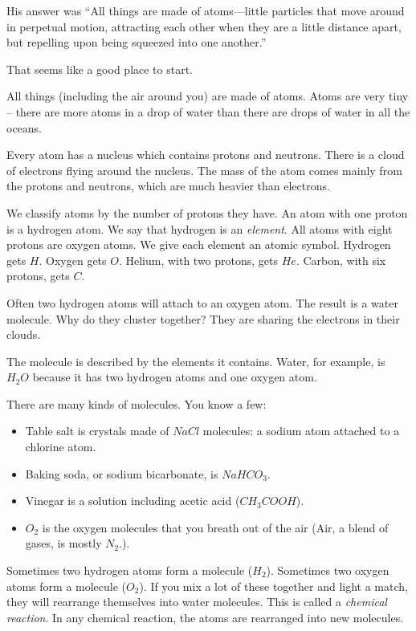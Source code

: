 His answer was ``All things are made of atoms—little particles that move around in
perpetual motion, attracting each other when they are a little
distance apart, but repelling upon being squeezed into one another.''

That seems like a good place to start.

All things (including the air around you) are made of atoms. Atoms are
very tiny -- there are more atoms in a drop of water than there are
drops of water in all the oceans.

Every atom has a nucleus which contains protons and neutrons. There is
a cloud of electrons flying around the nucleus. The mass of the atom
comes mainly from the protons and neutrons, which are much heavier
than electrons.  

We classify atoms by the number of protons they have. An atom with one
proton is a hydrogen atom. We say that hydrogen is an
\textit{element}. All atoms with eight protons are oxygen atoms. We
give each element an atomic symbol. Hydrogen gets $H$.  Oxygen gets
$O$. Helium, with two protons, gets $He$. Carbon, with six protons,
gets $C$.

Often two hydrogen atoms will attach to an oxygen atom.  The result is
a water molecule. Why do they cluster together? They are sharing the
electrons in their clouds.

The molecule is described by the elements it contains.  Water, for
example, is $H_2O$ because it has two hydrogen atoms and one oxygen
atom.

There are many kinds of molecules. You know a few:
\begin{itemize}
\item Table salt is crystals made of $NaCl$ molecules: a sodium atom attached to a chlorine atom.
\item Baking soda, or sodium bicarbonate, is $NaHCO_3$.
\item Vinegar is a solution including acetic acid ($CH_3COOH$).
\item $O_2$ is the oxygen molecules that you breath out of the air (Air, a blend of gases, is mostly $N_2$.).
\end{itemize}


Sometimes two hydrogen atoms form a molecule ($H_2$). Sometimes two
oxygen atoms form a molecule ($O_2$). If you mix a lot of these
together and light a match, they will rearrange themselves into water
molecules. This is called a \textit{chemical reaction}.  In any
chemical reaction, the atoms are rearranged into new molecules.

